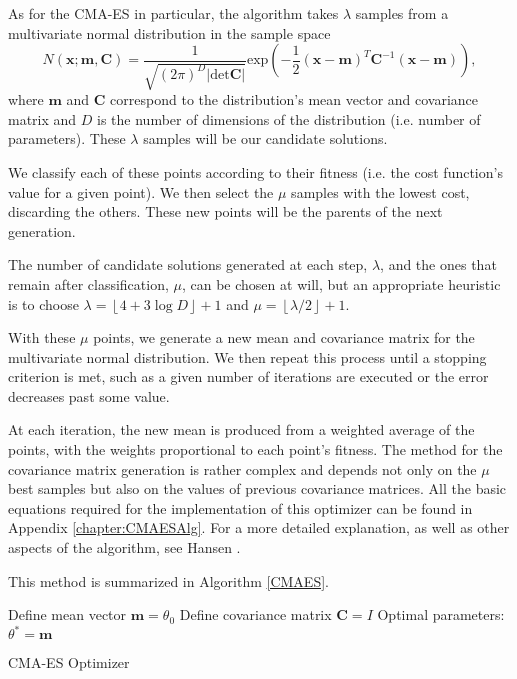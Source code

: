 As for the CMA-ES in particular, the algorithm takes $\lambda$ samples from a multivariate normal distribution in the sample space
\begin{equation}
N(\mathbf{x;m,C})=\frac{1}{\sqrt{(2\pi)^D|\mathrm{det}\mathbf{C}|}}\mathrm{exp}\left(-\frac{1}{2}(\mathbf{x}-\mathbf{m})^T\mathbf{C}^{-1}(\mathbf{x}-\mathbf{m})\right),
\end{equation}
\noindent where $\mathbf{m}$ and $\mathbf{C}$ correspond to the distribution's mean vector and covariance matrix and $D$ is the number of dimensions of the distribution (i.e. number of parameters).
These $\lambda$ samples will be our candidate solutions.

We classify each of these points according to their fitness (i.e. the cost function's value for a given point). We then select the $\mu$ samples with the lowest cost, discarding the others. These new points will be the parents of the next generation.

The number of candidate solutions generated at each step, $\lambda$, and the ones that remain after classification, $\mu$, can be chosen at will, but an appropriate heuristic is to choose $\lambda=\left\lfloor4+3\log D\right\rfloor+1$ and $\mu=\left\lfloor\lambda/2\right\rfloor+1$.

With these $\mu$ points, we generate a new mean and covariance matrix for the multivariate normal distribution. We then repeat this process until a stopping criterion is met, such as a given number of iterations are executed or the error decreases past some value.

At each iteration, the new mean is produced from a weighted average of the points, with the weights proportional to each point's fitness.
The method for the covariance matrix generation is rather complex and depends not only on the $\mu$ best samples but also on the values of previous covariance matrices. All the basic equations required for the implementation of this optimizer can be found in Appendix \ref{chapter:CMAESAlg}. For a more detailed explanation, as well as other aspects of the algorithm, see Hansen \cite{Hansen}.


This method is summarized in Algorithm \ref{CMAES}.

\begin{algorithm}[H]\label{CMAES}
\DontPrintSemicolon
Define mean vector $\mathbf{m}=\theta_0$
Define covariance matrix $\mathbf{C}=I$\;
 Optimal parameters: $\theta^{*}=\mathbf{m}$\;
 \caption{CMA-ES Optimizer}
\end{algorithm}
\

